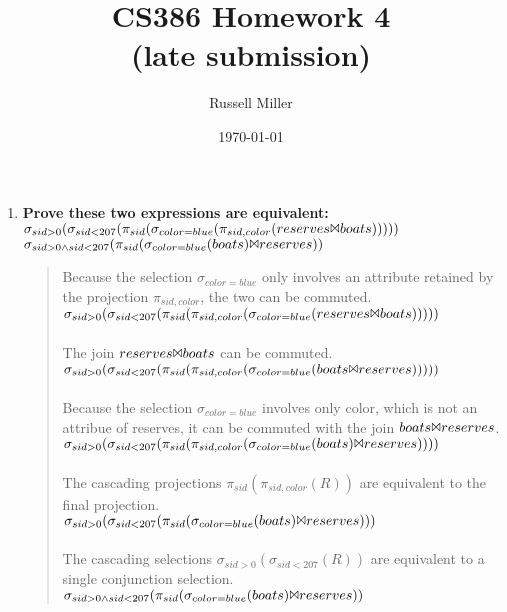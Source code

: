 \documentclass{article}
\title{CS386 Homework 4\\
(late submission)}
\author{Russell Miller}
\date{\today}
\begin{document}
\maketitle

\begin{enumerate}
\item
\textbf{Prove these two expressions are equivalent:\\}
$\sigma_{sid > 0}(\sigma_{sid < 207}(\pi_{sid}(\sigma_{color=blue}(\pi_{sid,color}(
 reserves \Bowtie boats)))))$\\
$\sigma_{sid > 0 \wedge sid < 207}(\pi_{sid}(\sigma_{color=blue}(
 boats) \Bowtie reserves))$\\

\begin{quote}
Because the selection $\sigma_{color=blue}$ only involves an attribute retained by the
projection $\pi_{sid,color}$, the two can be commuted.\\
$\sigma_{sid > 0}(\sigma_{sid < 207}(\pi_{sid}(\pi_{sid,color}(\sigma_{color=blue}(
 reserves \Bowtie boats)))))$\\
\\
The join $reserves \Bowtie boats$ can be commuted.\\
$\sigma_{sid > 0}(\sigma_{sid < 207}(\pi_{sid}(\pi_{sid,color}(\sigma_{color=blue}(
 boats \Bowtie reserves)))))$\\
\\
Because the selection $\sigma_{color=blue}$ involves only color, which is not an attribue
of reserves, it can be commuted with the join $boats \Bowtie reserves$.\\
$\sigma_{sid > 0}(\sigma_{sid < 207}(\pi_{sid}(\pi_{sid,color}(\sigma_{color=blue}(
 boats) \Bowtie reserves))))$\\
\\
The cascading projections $\pi_{sid}(\pi_{sid,color}(R))$ are equivalent to the final
projection.\\
$\sigma_{sid > 0}(\sigma_{sid < 207}(\pi_{sid}(\sigma_{color=blue}(
 boats) \Bowtie reserves)))$\\
\\
The cascading selections $\sigma_{sid > 0}(\sigma_{sid < 207}(R))$ are equivalent to
a single conjunction selection.\\
$\sigma_{sid > 0 \wedge sid < 207}(\pi_{sid}(\sigma_{color=blue}(
 boats) \Bowtie reserves))$\\
\end{quote}


\end{enumerate}
\end{document}
